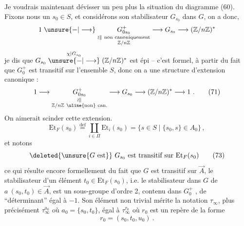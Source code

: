Je voudrais maintenant dévisser un peu plus la situation du diagramme (60). Fixons nous un $s_0\in S$, et considérons son stabilisateur  $G_{s_0}$ dans $G$, on a donc, 
\[
1\mathrel{\unsure{-|\longrightarrow}}\underset{\substack{\wr\Vert\ \text{non canoniquement}\\\mathbb Z/n\mathbb Z}}{G^+_{0s_0}}
 \longrightarrow G_{s_0}\longrightarrow(\mathbb Z/n\mathbb Z)^*
\]
je dis que $G_{s_0}\mathrel{\overset{\chi\mid G_{s_0}}{\unsure{-|\longrightarrow}}}(\mathbb Z/n\mathbb Z)^*$ est épi -- c'est formel, à partir du fait que $G_0^+$ est transitif sur l'ensemble $S$, donc on a une structure d'extension canonique :
\[
1\longrightarrow\underset{\substack{\wr\Vert\\\mathbb Z/n\mathbb Z\ \text{\uline{non} can.}}}{G^+_{0s_0}}
\longrightarrow G_{s_0}\longrightarrow(\mathbb Z/n\mathbb Z)^*\longrightarrow1\ .
\tag*{(71)}
\]
On aimerait scinder cette extension. 
\[
\mathrm{Et}_F(s_0)\overset{\mathrm{def}}{=}\coprod_{i\in\Pi}\mathrm{Et}_i(s_0)
=\{s\in S\mid\{s_0,s\}\in A_0\}\,,
\tag*{(72)}
\]
et notons
\[
\deleted{\unsure{G\ \text{est}}}\ G_{s_0}\text{ est transitif sur }\mathrm{Et}_F(s_0)
\tag*{(73)}
\]
ce qui résulte encore formellement du fait que $G$ est transitif sur $\vec A$,  le stabilisateur  d'un élément $t_0\in\mathrm{Et}_F(s_0)$, i.e. le stabilisateur dans $G$ de $a\ (s_0,t_0)\in\vec A$, est un sous-groupe d'ordre 2, contenu dans $G_0^+$ , de ``déterminant'' égal à $-1$. Son élément non trivial mérite la notation $\tau_\infty$, plus précisément $\tau_\infty^{a_0}$ où $a_0=\{s_0,t_0\}$, égal à $\tau_\infty^{r_0}$ où $r_0$ est un repère de la forme
\[
r_0=(s_0,t_0,u_0)\ .
\]


